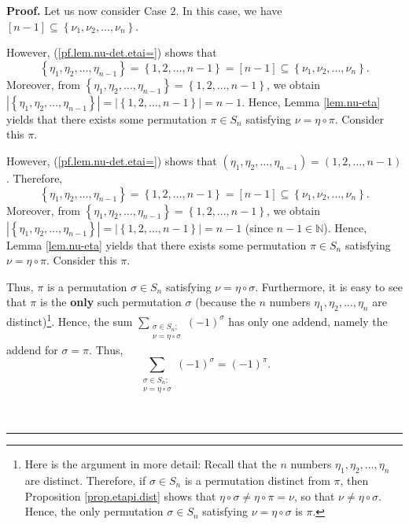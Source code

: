 \documentclass
[numbers=enddot,12pt,final,onecolumn,notitlepage,english]{scrartcl}%
\theoremstyle{definition}
\newenvironment{proof}[1][Proof]{\noindent\textbf{#1.} }{\ \rule{0.5em}{0.5em}}
\let\sumnonlimits\sum
\renewcommand{\sum}{\sumnonlimits\limits}
\newenvironment{verlong}{}{}
\newenvironment{vershort}{}{}
\begin{document}
\begin{proof}
Let us now consider Case 2. In this case, we have $\left[  n-1\right]
\subseteq\left\{  \nu_{1},\nu_{2},\ldots,\nu_{n}\right\}  $.

\begin{vershort}
However, (\ref{pf.lem.nu-det.etai=}) shows that
\[
\left\{  \eta_{1},\eta_{2},\ldots,\eta_{n-1}\right\}  =\left\{  1,2,\ldots
,n-1\right\}  =\left[  n-1\right]  \subseteq\left\{  \nu_{1},\nu_{2}%
,\ldots,\nu_{n}\right\}  .
\]
Moreover, from $\left\{  \eta_{1},\eta_{2},\ldots,\eta_{n-1}\right\}
=\left\{  1,2,\ldots,n-1\right\}  $, we obtain $\left\vert \left\{  \eta
_{1},\eta_{2},\ldots,\eta_{n-1}\right\}  \right\vert =\left\vert \left\{
1,2,\ldots,n-1\right\}  \right\vert =n-1$. Hence, Lemma \ref{lem.nu-eta}
yields that there exists some permutation $\pi\in S_{n}$ satisfying $\nu
=\eta\circ\pi$. Consider this $\pi$.
\end{vershort}

\begin{verlong}
However, (\ref{pf.lem.nu-det.etai=}) shows that $\left(  \eta_{1},\eta
_{2},\ldots,\eta_{n-1}\right)  =\left(  1,2,\ldots,n-1\right)  $. Therefore,
\[
\left\{  \eta_{1},\eta_{2},\ldots,\eta_{n-1}\right\}  =\left\{  1,2,\ldots
,n-1\right\}  =\left[  n-1\right]  \subseteq\left\{  \nu_{1},\nu_{2}%
,\ldots,\nu_{n}\right\}  .
\]
Moreover, from $\left\{  \eta_{1},\eta_{2},\ldots,\eta_{n-1}\right\}
=\left\{  1,2,\ldots,n-1\right\}  $, we obtain $\left\vert \left\{  \eta
_{1},\eta_{2},\ldots,\eta_{n-1}\right\}  \right\vert =\left\vert \left\{
1,2,\ldots,n-1\right\}  \right\vert =n-1$ (since $n-1\in\mathbb{N}$). Hence,
Lemma \ref{lem.nu-eta} yields that there exists some permutation $\pi\in
S_{n}$ satisfying $\nu=\eta\circ\pi$. Consider this $\pi$.
\end{verlong}

\begin{vershort}
Thus, $\pi$ is a permutation $\sigma\in S_{n}$ satisfying $\nu=\eta\circ
\sigma$. Furthermore, it is easy to see that $\pi$ is the \textbf{only} such
permutation $\sigma$ (because the $n$ numbers $\eta_{1},\eta_{2},\ldots
,\eta_{n}$ are distinct)\footnote{Here is the argument in more detail: Recall
that the $n$ numbers $\eta_{1},\eta_{2},\ldots,\eta_{n}$ are distinct.
Therefore, if $\sigma\in S_{n}$ is a permutation distinct from $\pi$, then
Proposition \ref{prop.etapi.dist} shows that $\eta\circ\sigma\neq\eta\circ
\pi=\nu$, so that $\nu\neq\eta\circ\sigma$. Hence, the only permutation
$\sigma\in S_{n}$ satisfying $\nu=\eta\circ\sigma$ is $\pi$.}. Hence, the sum
$\sum_{\substack{\sigma\in S_{n};\\\nu=\eta\circ\sigma}}\left(  -1\right)
^{\sigma}$ has only one addend, namely the addend for $\sigma=\pi$. Thus,
\begin{equation}
\sum_{\substack{\sigma\in S_{n};\\\nu=\eta\circ\sigma}}\left(  -1\right)
^{\sigma}=\left(  -1\right)  ^{\pi}. \label{pf.lem.nu-det.c2.short.sum=}%
\end{equation}


\end{vershort}
\end{proof}
\end{document}
